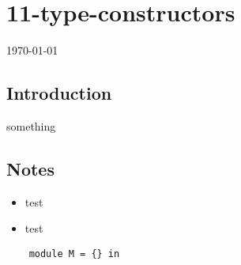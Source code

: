 \documentclass[12pt]{article}
\begin{document}
\section*{11-type-constructors}
\today
\subsection*{Introduction}
something
\subsection*{Notes}
\begin{itemize}
    \item test
    \item test
\end{itemize}
\begin{verbatim}
    module M = {} in
\end{verbatim}
\end{document}

